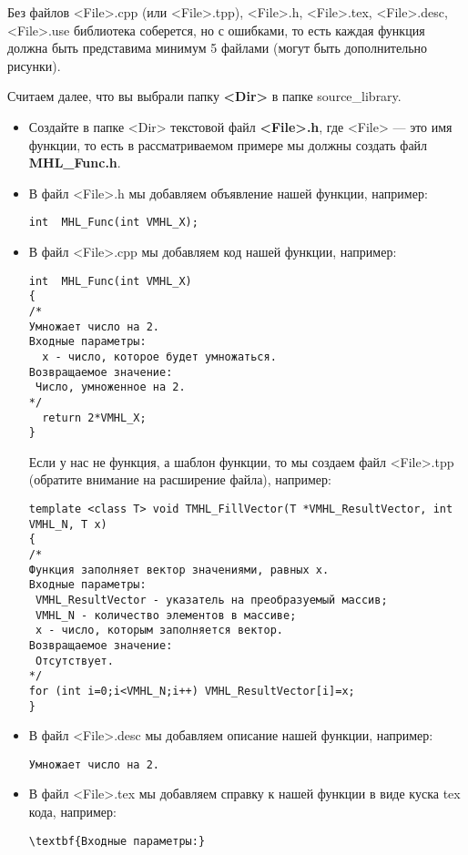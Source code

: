 Без файлов <File>.cpp (или <File>.tpp), <File>.h, <File>.tex, <File>.desc, <File>.use библиотека соберется, но с ошибками, то есть каждая функция должна быть представима минимум 5 файлами (могут быть дополнительно рисунки).

Считаем далее, что вы выбрали папку \textbf{<Dir>} в папке source\_library. 

\begin{itemize}
\item Создайте в папке <Dir> текстовой файл \textbf{<File>.h}, где <File> --- это имя функции, то есть в рассматриваемом примере мы должны создать файл \textbf{MHL\_Func.h}.
\item В файл <File>.h мы добавляем объявление нашей функции, например:
\begin{lstlisting}[label=examplefileh, caption=Содержимое MHL\_Func.h]
int  MHL_Func(int VMHL_X);
\end{lstlisting}
\item В файл <File>.cpp мы добавляем код нашей функции, например:
\begin{lstlisting}[label=examplefilecpp, caption=Содержимое MHL\_Func.cpp]
int  MHL_Func(int VMHL_X)
{
/*
Умножает число на 2.
Входные параметры:
  x - число, которое будет умножаться.
Возвращаемое значение:
 Число, умноженное на 2.
*/
  return 2*VMHL_X;
}
\end{lstlisting}

Если у нас не функция, а шаблон функции, то мы создаем файл <File>.tpp (обратите внимание на расширение файла), например:
\begin{lstlisting}[label=examplefiletpp, caption=Содержимое TMHL\_FillVector.tpp]
template <class T> void TMHL_FillVector(T *VMHL_ResultVector, int VMHL_N, T x)
{
/*
Функция заполняет вектор значениями, равных x.
Входные параметры:
 VMHL_ResultVector - указатель на преобразуемый массив;
 VMHL_N - количество элементов в массиве;
 x - число, которым заполняется вектор.
Возвращаемое значение:
 Отсутствует.
*/
for (int i=0;i<VMHL_N;i++) VMHL_ResultVector[i]=x;
}
\end{lstlisting}

\item В файл <File>.desc мы добавляем описание нашей функции, например:
\begin{lstlisting}[label=examplefiledesc, caption=Содержимое MHL\_Func.desc]
Умножает число на 2.
\end{lstlisting}

\item В файл <File>.tex мы добавляем справку к нашей функции в виде куска tex кода, например:
\begin{lstlisting}[label=examplefiletex, caption=Содержимое MHL\_Func.tex]
\textbf{Входные параметры:}


\end{lstlisting}
\end{itemize}
